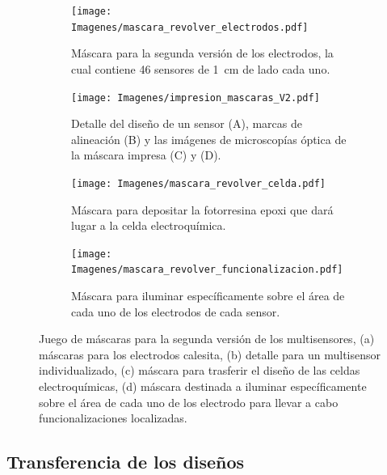 				 		\begin{figure}[ht!]
			 	   	    \centering
			 	   	    \begin{subfigure}[t]{0.495\textwidth}
			        	\texttt{[image: Imagenes/mascara\_revolver\_electrodos.pdf]}
			       		\caption{Máscara para la segunda versión de los electrodos, la cual contiene 46 sensores de \SI{1}{cm} de lado cada uno.}
			         	\label{fig:mascara_v2}
			     		\end{subfigure}
			     		\begin{subfigure}[t]{0.495\textwidth}
			     		\texttt{[image: Imagenes/impresion\_mascaras\_V2.pdf]}
			    		\caption{Detalle del diseño de un sensor (A), marcas de alineación (B) y las imágenes de microscopías óptica de la máscara impresa (C) y (D).}
			    		\label{fig:impresion_diseno_v2_b}	
						\end{subfigure}
			     		\begin{subfigure}[t]{0.495\textwidth}
			         	\vspace*{1mm}
			         	\texttt{[image: Imagenes/mascara\_revolver\_celda.pdf]}
			        	\caption{Máscara para depositar la fotorresina epoxi que dará lugar a la celda electroquímica.}
			         	\label{fig:mascara_su8}
			     		\end{subfigure}
						\begin{subfigure}[t]{0.495\textwidth}
			     		\vspace*{1mm}
			     		\texttt{[image: Imagenes/mascara\_revolver\_funcionalizacion.pdf]}
			        	\caption{Máscara para iluminar específicamente sobre el área de cada uno de los electrodos de cada sensor.}
			         	\label{fig:mascara_funcionalizacion}
			     		\end{subfigure}
			     		\caption[Juego de máscara. Segunda versión]{Juego de máscaras para la segunda versión de los multisensores, (a) máscaras  para los electrodos calesita, (b) detalle para un multisensor individualizado, (c) máscara para trasferir el diseño de las celdas electroquímicas, (d) máscara destinada a iluminar específicamente sobre el área de cada uno de los electrodo para llevar a cabo funcionalizaciones localizadas.}
			     		\label{fig:impresion_diseno_V2}
			     		\vspace*{3mm}
			     	   	\end{figure}

	\subsection{Transferencia de los diseños}

